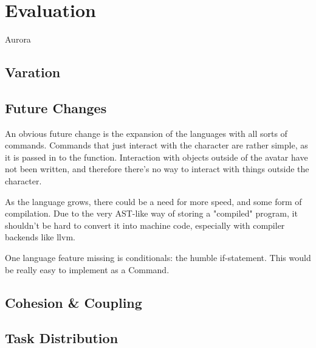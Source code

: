 \chapter{Evaluation}
Aurora

\section{Varation}


\section{Future Changes}
An obvious future change is the expansion of the languages with all sorts of commands. Commands that just interact with the character are rather simple, as it is passed in to the function. Interaction
with objects outside of the avatar have not been written, and therefore there's no way to interact with things outside the character. 

As the language grows, there could be a need for more speed, and some form of compilation. Due to the very AST-like way of storing a "compiled" program, it shouldn't be hard to convert it into machine
code, especially with compiler backends like llvm.

One language feature missing is conditionals: the humble if-statement. This would be really easy to implement as a Command.

\section{Cohesion \& Coupling}


\section{Task Distribution}
